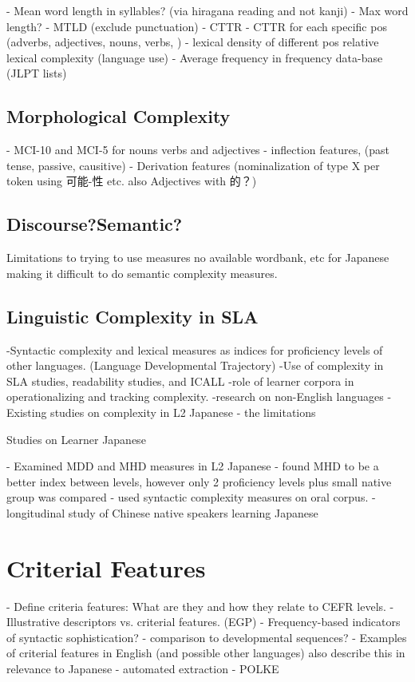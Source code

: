     - Mean word length in syllables? (via hiragana reading and not kanji)
    - Max word length?
    - MTLD (exclude punctuation)
    - CTTR
    - CTTR for each specific pos (adverbs, adjectives, nouns, verbs, )
    - lexical density of different pos
relative lexical complexity (language use)
    - Average frequency in frequency data-base (JLPT lists)

\subsection{Morphological Complexity}
    - MCI-10 and MCI-5 for nouns verbs and adjectives
    - inflection features, (past tense, passive, causitive)
    - Derivation features (nominalization of type X per token using 可能-性 etc. also Adjectives with 的？)

\subsection{Discourse?Semantic?}
Limitations to trying to use measures no available wordbank, etc for Japanese making it difficult to do semantic
complexity measures.

\subsection{Linguistic Complexity in SLA}
-Syntactic complexity and lexical measures as indices for proficiency levels of other languages. (Language Developmental Trajectory)
-Use of complexity in SLA studies, readability studies, and ICALL
-role of learner corpora in operationalizing and tracking complexity.
-research on non-English languages
-Existing studies on complexity in L2 Japanese - the limitations

Studies on Learner Japanese


\citet{komori2019} - Examined MDD and MHD measures in L2 Japanese - found MHD to be a better index between levels,
however only 2 proficiency levels plus small native group was compared
\citet{Iwashita2006} - used syntactic complexity measures on oral corpus.
\citet{Yang2023} - longitudinal study of Chinese native speakers learning Japanese

\section{Criterial Features}
- Define criteria features: What are they and how they relate to CEFR levels.
- Illustrative descriptors vs. criterial features. (EGP)
- Frequency-based indicators of syntactic sophistication? \cite{Ellis2004}
    - comparison to developmental sequences?
- Examples of criterial features in English (and possible other languages) also describe this in relevance to Japanese
- automated extraction - POLKE



